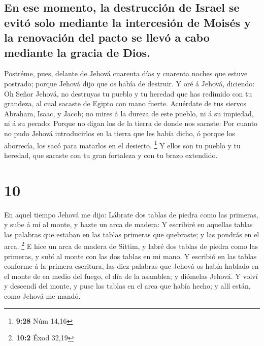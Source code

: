 \hypertarget{en-ese-momento-la-destrucciuxf3n-de-israel-se-evituxf3-solo-mediante-la-intercesiuxf3n-de-moisuxe9s-y-la-renovaciuxf3n-del-pacto-se-llevuxf3-a-cabo-mediante-la-gracia-de-dios.}{%
\subsection{En ese momento, la destrucción de Israel se evitó solo
mediante la intercesión de Moisés y la renovación del pacto se llevó a
cabo mediante la gracia de
Dios.}\label{en-ese-momento-la-destrucciuxf3n-de-israel-se-evituxf3-solo-mediante-la-intercesiuxf3n-de-moisuxe9s-y-la-renovaciuxf3n-del-pacto-se-llevuxf3-a-cabo-mediante-la-gracia-de-dios.}}

 Postréme, pues, delante de Jehová cuarenta días y
cuarenta noches que estuve postrado; porque Jehová dijo que os había de
destruir.  Y oré á Jehová, diciendo: Oh Señor Jehová, no
destruyas tu pueblo y tu heredad que has redimido con tu grandeza, al
cual sacaste de Egipto con mano fuerte.  Acuérdate de tus
siervos Abraham, Isaac, y Jacob; no mires á la dureza de este pueblo, ni
á su impiedad, ni á su pecado:  Porque no digan los de la
tierra de donde nos sacaste: Por cuanto no pudo Jehová introducirlos en
la tierra que les había dicho, ó porque los aborrecía, los sacó para
matarlos en el desierto. \footnote{\textbf{9:28} Núm 14,16}
 Y ellos son tu pueblo y tu heredad, que sacaste con tu
gran fortaleza y con tu brazo extendido.

\hypertarget{section-9}{%
\section{10}\label{section-9}}

 En aquel tiempo Jehová me dijo: Lábrate dos tablas de
piedra como las primeras, y sube á mí al monte, y hazte un arca de
madera:  Y escribiré en aquellas tablas las palabras que
estaban en las tablas primeras que quebraste; y las pondrás en el arca.
\footnote{\textbf{10:2} Éxod 32,19}  E hice un arca de
madera de Sittim, y labré dos tablas de piedra como las primeras, y subí
al monte con las dos tablas en mi mano.  Y escribió en las
tablas conforme á la primera escritura, las diez palabras que Jehová os
había hablado en el monte de en medio del fuego, el día de la asamblea;
y diómelas Jehová.  Y volví y descendí del monte, y puse
las tablas en el arca que había hecho; y allí están, como Jehová me
mandó.


